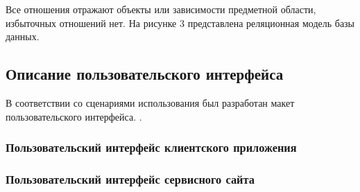 \tab
Все отношения отражают объекты или зависимости предметной области, избыточных отношений нет.
На рисунке 3 представлена реляционная модель базы данных.
\picturethree

\subsection{Описание пользовательского интерфейса}

\tab
В соответствии со сценариями использования был разработан макет пользовательского интерфейса.
.

\subsubsection{Пользовательский интерфейс клиентского приложения}

\subsubsection{Пользовательский интерфейс сервисного сайта}

